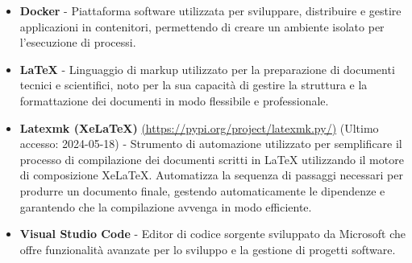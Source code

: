 \begin{itemize}
    \item \textbf{Docker} - Piattaforma software utilizzata per sviluppare, distribuire e gestire applicazioni in contenitori, permettendo di creare un ambiente isolato per l'esecuzione di processi.
    
    \item \textbf{LaTeX} - Linguaggio di markup utilizzato per la preparazione di documenti tecnici e scientifici, noto per la sua capacità di gestire la struttura e la formattazione dei documenti in modo flessibile e professionale.
    
    \item \textbf{Latexmk (XeLaTeX)} \href{https://pypi.org/project/latexmk.py/}{(https://pypi.org/project/latexmk.py/)} (Ultimo accesso: 2024-05-18) - Strumento di automazione utilizzato per semplificare il processo di compilazione dei documenti scritti in LaTeX utilizzando il motore di composizione XeLaTeX. Automatizza la sequenza di passaggi necessari per produrre un documento finale, gestendo automaticamente le dipendenze e garantendo che la compilazione avvenga in modo efficiente.
    
    \item \textbf{Visual Studio Code} - Editor di codice sorgente sviluppato da Microsoft che offre funzionalità avanzate per lo sviluppo e la gestione di progetti software.
\end{itemize}
